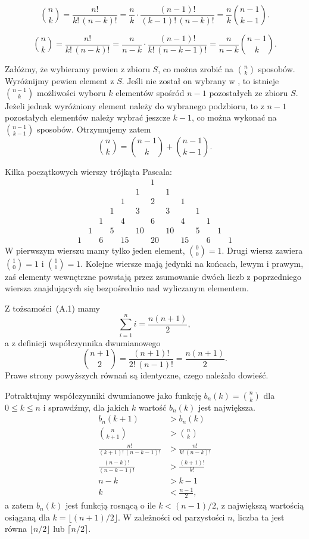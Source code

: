\exercise{} %
\[
	\binom{n}{k} = \frac{n!}{k!\,(n-k)!} = \frac{n}{k}\cdot\frac{(n-1)!}{(k-1)!\,(n-k)!} = \frac{n}{k}\binom{n-1}{k-1}.
\]

\exercise{} %
\[
	\binom{n}{k} = \frac{n!}{k!\,(n-k)!} = \frac{n}{n-k}\cdot\frac{(n-1)!}{k!\,(n-k-1)!} = \frac{n}{n-k}\binom{n-1}{k}.
\]

\exercise{} %
Załóżmy, że wybieramy pewien  z  zbioru $S$, co można zrobić na $\binom{n}{k}$ sposobów. Wyróżnijmy pewien element z $S$. Jeśli nie został on wybrany w , to istnieje $\binom{n-1}{k}$ możliwości wyboru $k$ elementów spośród $n-1$ pozostałych ze zbioru $S$. Jeżeli jednak wyróżniony element należy do wybranego podzbioru, to z $n-1$ pozostałych elementów należy wybrać jeszcze $k-1$, co można wykonać na $\binom{n-1}{k-1}$ sposobów. Otrzymujemy zatem
\[
	\binom{n}{k} = \binom{n-1}{k}+\binom{n-1}{k-1}.
\]

\exercise{} %
Kilka początkowych wierszy trójkąta Pascala:
\[
	\begin{array}{ccccccccccccc}
		&&&&&& 1 \\
		&&&&& 1 && 1 \\
		&&&& 1 && 2 && 1 \\
		&&& 1 && 3 && 3 && 1 \\
		&& 1 && 4 && 6 && 4 && 1 \\
		& 1 && 5 && 10 && 10 && 5 && 1 \\
		1 && 6 && 15 && 20 && 15 && 6 && 1
	\end{array}
\]
W pierwszym wierszu mamy tylko jeden element, $\binom{0}{0}=1$. Drugi wiersz zawiera $\binom{1}{0}=1$ i $\binom{1}{1}=1$. Kolejne wiersze mają jedynki na końcach, lewym i prawym, zaś elementy wewnętrzne powstają przez zsumowanie dwóch liczb z poprzedniego wiersza znajdujących się bezpośrednio nad wyliczanym elementem.

\exercise{} %
Z tożsamości~(A.1) mamy
\[
	\sum_{i=1}^ni = \frac{n(n+1)}{2},
\]
a z definicji współczynnika dwumianowego
\[
	\binom{n+1}{2} = \frac{(n+1)!}{2!\,(n-1)!} = \frac{n(n+1)}{2}.
\]
Prawe strony powyższych równań są identyczne, czego należało dowieść.

\exercise{} %
Potraktujmy współczynniki dwumianowe jako funkcję $b_n(k)=\binom{n}{k}$ dla $0\le k\le n$ i sprawdźmy, dla jakich $k$ wartość $b_n(k)$ jest największa.
\begin{align*}
	b_n(k+1) &> b_n(k) \\
	\binom{n}{k+1} &> \binom{n}{k} \\
	\frac{n!}{(k+1)!\,(n-k-1)!} &> \frac{n!}{k!\,(n-k)!} \\
	\frac{(n-k)!}{(n-k-1)!} &> \frac{(k+1)!}{k!} \\
	n-k &> k-1 \\
	k &< \frac{n-1}{2},
\end{align*}
a zatem $b_n(k)$ jest funkcją rosnącą o ile $k<(n-1)/2$, z największą wartością osiąganą dla $k=\lfloor(n+1)/2\rfloor$. W zależności od parzystości $n$, liczba ta jest równa $\lfloor n/2\rfloor$ lub $\lceil n/2\rceil$.

